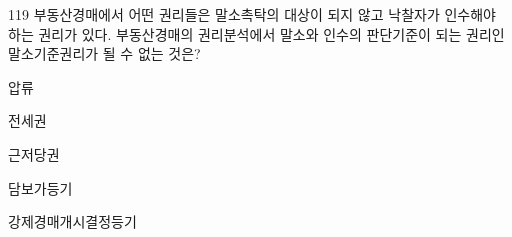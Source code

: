 \begin{question}{119}
부동산경매에서 어떤 권리들은 말소촉탁의 대상이 되지 않고 낙찰자가 인수해야 하는 권리가 있다. 부동산경매의 권리분석에서 말소와 인수의 판단기준이 되는 권리인 말소기준권리가 될 수 없는 것은?
\begin{choices}
  \item 압류
  \item 전세권
  \item 근저당권
  \item 담보가등기
  \item 강제경매개시결정등기
\end{choices}
\end{question}
